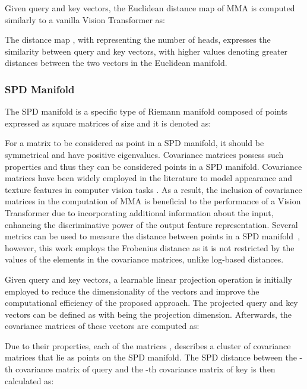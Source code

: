 \documentclass[10pt,twocolumn,letterpaper]{article}
\begin{document}
Given query  and key  vectors, the Euclidean distance map of MMA is computed similarly to a vanilla Vision Transformer as:



The distance map , with  representing the number of heads, expresses the similarity between query and key vectors, with higher values denoting greater distances between the two vectors in the Euclidean manifold.

\subsubsection{SPD Manifold}

The SPD manifold is a specific type of Riemann manifold composed of points expressed as square matrices  of size  and it is denoted as:



For a matrix to be considered as point in a SPD manifold, it should be symmetrical and have positive eigenvalues. Covariance matrices possess such properties and thus they can be considered points in a SPD manifold. Covariance matrices have been widely employed in the literature to model appearance and texture features in computer vision tasks \cite{Author17,Author42}. As a result, the inclusion of covariance matrices in the computation of MMA is beneficial to the performance of a Vision Transformer due to incorporating additional information about the input, enhancing the discriminative power of the output feature representation. Several metrics can be used to measure the distance between points in a SPD manifold~\cite{Author13}, however, this work employs the Frobenius distance as it is not restricted by the values of the elements in the covariance matrices, unlike log-based distances.

Given query  and key  vectors, a learnable linear projection operation is initially employed to reduce the dimensionality of the vectors and improve the computational efficiency of the proposed approach. The projected query and key vectors can be defined as  with  being the projection dimension. Afterwards, the covariance matrices of these vectors are computed as:



Due to their properties, each of the matrices ,  describes a cluster of  covariance matrices that lie as points on the SPD manifold. The SPD distance between the -th covariance matrix of query and the -th covariance matrix of key is then calculated as:
\end{document}
